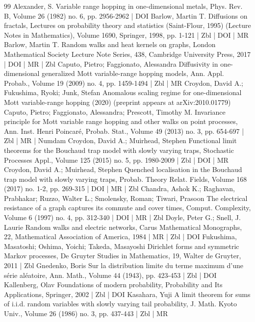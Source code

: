\begin{thebibliography}{99}
 Alexander, S. Variable range hopping in one-dimensional metals, Phys. Rev. B, Volume 26 (1982) no. 6, pp. 2956-2962 | DOI
 Barlow, Martin T. Diffusions on fractals, Lectures on probability theory and statistics (Saint-Flour, 1995) (Lecture Notes in Mathematics), Volume 1690, Springer, 1998, pp. 1-121 | Zbl | DOI | MR
 Barlow, Martin T. Random walks and heat kernels on graphs, London Mathematical Society Lecture Note Series, 438, Cambridge University Press, 2017 | DOI | MR | Zbl
 Caputo, Pietro; Faggionato, Alessandra Diffusivity in one-dimensional generalized Mott variable-range hopping models, Ann. Appl. Probab., Volume 19 (2009) no. 4, pp. 1459-1494 | Zbl | MR
 Croydon, David A.; Fukushima, Ryoki; Junk, Stefan Anomalous scaling regime for one-dimensional Mott variable-range hopping (2020) (preprint appears at arXiv:2010.01779)
 Caputo, Pietro; Faggionato, Alessandra; Prescott, Timothy M. Invariance principle for Mott variable range hopping and other walks on point processes, Ann. Inst. Henri Poincaré, Probab. Stat., Volume 49 (2013) no. 3, pp. 654-697 | Zbl | MR | Numdam
 Croydon, David A.; Muirhead, Stephen Functional limit theorems for the Bouchaud trap model with slowly varying traps, Stochastic Processes Appl., Volume 125 (2015) no. 5, pp. 1980-2009 | Zbl | DOI | MR
 Croydon, David A.; Muirhead, Stephen Quenched localisation in the Bouchaud trap model with slowly varying traps, Probab. Theory Relat. Fields, Volume 168 (2017) no. 1-2, pp. 269-315 | DOI | MR | Zbl
 Chandra, Ashok K.; Raghavan, Prabhakar; Ruzzo, Walter L.; Smolensky, Roman; Tiwari, Prasoon The electrical resistance of a graph captures its commute and cover times, Comput. Complexity, Volume 6 (1997) no. 4, pp. 312-340 | DOI | MR | Zbl
 Doyle, Peter G.; Snell, J. Laurie Random walks and electric networks, Carus Mathematical Monographs, 22, Mathematical Association of America, 1984 | MR | Zbl | DOI
 Fukushima, Masatoshi; Oshima, Yoichi; Takeda, Masayoshi Dirichlet forms and symmetric Markov processes, De Gruyter Studies in Mathematics, 19, Walter de Gruyter, 2011 | Zbl
 Gnedenko, Boris Sur la distribution limite du terme maximum d’une série aléatoire, Ann. Math., Volume 44 (1943), pp. 423-453 | Zbl | DOI
 Kallenberg, Olav Foundations of modern probability, Probability and Its Applications, Springer, 2002 | Zbl | DOI
 Kasahara, Yuji A limit theorem for sums of i.i.d. random variables with slowly varying tail probability, J. Math. Kyoto Univ., Volume 26 (1986) no. 3, pp. 437-443 | Zbl | MR

\end{thebibliography}
